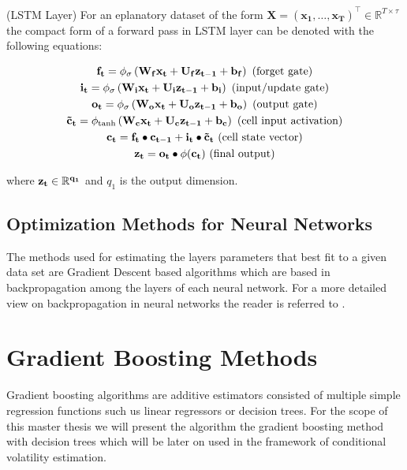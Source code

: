 \documentclass[a4paper, oneside]{discothesis}
\begin{document}
(LSTM Layer) For an eplanatory dataset of the form $\bm{X} = \left(\bm{x_1}, \dots, \bm{x_T}\right)^\intercal\in \mathbb{R}^{T\times \tau} $ the compact form of a forward pass in LSTM layer can be denoted with the following equations:

\begin{gather}
    \bf{f_t} = \phi_\sigma\left(\bf{W_f}\bf{x_t}+\bf{U_f}\bf{z_{t-1}+\bf{b_f}}\right) \text{  (forget gate)}\\
    \bf{i_t} = \phi_\sigma\left(\bf{W_i}\bf{x_t}+\bf{U_i}\bf{z_{t-1}+\bf{b_i}}\right) \text{  (input/update gate)}\\
    \bf{o_t} = \phi_\sigma\left(\bf{W_o}\bf{x_t}+\bf{U_o}\bf{z_{t-1}+\bf{b_o}}\right) \text{  (output gate)}\\
    \bf{\tilde{c}_t} = \phi_{\text{tanh}}\left(\bf{W_c}\bf{x_t}+\bf{U_c}\bf{z_{t-1}+\bf{b_c}}\right) \text{   (cell input activation)}\\
    \bf{c_t} = \bf{f_t}\bullet \bf{c_{t-1}}+\bf{i_t}\bullet\bf{\tilde{c}_t} \text{  (cell state vector)}\\
    \bf{z_t} = \bf{o_t}\bullet\phi(\bf{c_t}) \text{  (final output)}
\end{gather}

where $\bf{z_t}\in\mathbb{R}^{q_1}$ and $q_1$ is the output dimension.

\subsection{Optimization Methods for Neural Networks}\label{ssec:num1}

The methods used for estimating the layers parameters that best fit to a given data set are Gradient Descent based algorithms which are based in backpropagation \cite{Linnainmaa1976} among the layers of each neural network. For a more detailed view on backpropagation in neural networks the reader is referred to \cite{murphyMLProba}.
\section{Gradient Boosting Methods}

Gradient boosting algorithms are additive estimators consisted of multiple simple regression functions such us linear regressors or decision trees. For the scope of this master thesis we will present the algorithm the gradient boosting method with decision trees which will be later on used in the framework of conditional volatility estimation.
\end{document}
